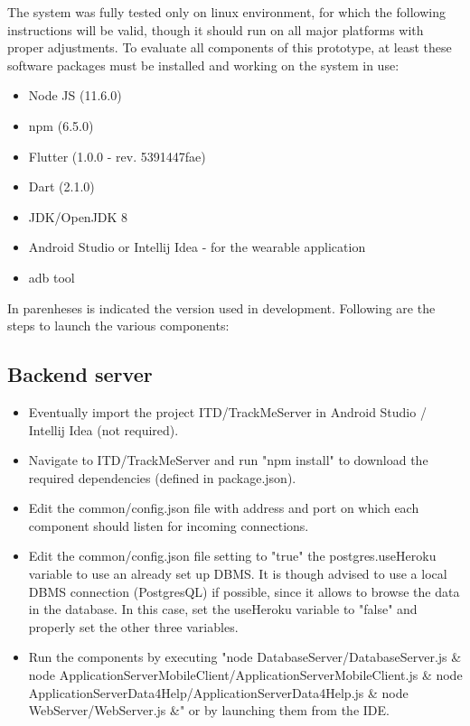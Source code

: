\documentclass[../main.tex]{subfiles}
\begin{document}
The system was fully tested only on linux environment, for which the following instructions will be valid, though it should run on all major platforms with proper adjustments. To evaluate all components of this prototype, at least these software packages must be installed and working on the system in use:

\begin{itemize}
	\item Node JS (11.6.0)
	\item npm (6.5.0)
	\item Flutter (1.0.0 - rev. 5391447fae)
	\item Dart (2.1.0)
	\item JDK/OpenJDK 8
	\item Android Studio or Intellij Idea - for the wearable application
	\item adb tool
\end{itemize}

In parenheses is indicated the version used in development. Following are the steps to launch the various components:

\subsection{Backend server}

\begin{itemize}
	\item Eventually import the project ITD/TrackMeServer in Android Studio / Intellij Idea (not required).
	\item Navigate to ITD/TrackMeServer and run "npm install" to download the required dependencies (defined in package.json).
	\item Edit the common/config.json file with address and port on which each component should listen for incoming connections.
	\item Edit the common/config.json file setting to "true" the postgres.useHeroku variable to use an already set up DBMS. It is though advised to use a local DBMS connection (PostgresQL) if possible, since it allows to browse the data in the database. In this case, set the useHeroku variable to "false" and properly set the other three variables.
	\item Run the components by executing \newline "node DatabaseServer/DatabaseServer.js \& \newline node ApplicationServerMobileClient/ApplicationServerMobileClient.js \& \newline node ApplicationServerData4Help/ApplicationServerData4Help.js \& \newline node WebServer/WebServer.js \&" \newline or by launching them from the IDE.
\end{itemize}
\end{document}
